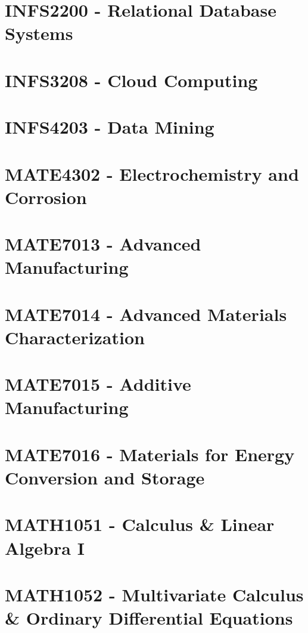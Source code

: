 \documentclass[a4paper,12pt]{report}
\begin{document}
\hypertarget{INFS2200}{\section{INFS2200 - Relational Database Systems}}

\hypertarget{INFS3208}{\section{INFS3208 - Cloud Computing}}

\hypertarget{INFS4203}{\section{INFS4203 - Data Mining}}

\hypertarget{MATE4302}{\section{MATE4302 - Electrochemistry and Corrosion}}

\hypertarget{MATE7013}{\section{MATE7013 - Advanced Manufacturing}}

\hypertarget{MATE7014}{\section{MATE7014 - Advanced Materials Characterization}}

\hypertarget{MATE7015}{\section{MATE7015 - Additive Manufacturing}}

\hypertarget{MATE7016}{\section{MATE7016 - Materials for Energy Conversion and Storage}}

\hypertarget{MATH1051}{\section{MATH1051 - Calculus \& Linear Algebra I}}

\hypertarget{MATH1052}{\section{MATH1052 - Multivariate Calculus \& Ordinary Differential Equations}}
\end{document}
